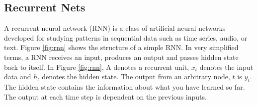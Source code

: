 \subsection{Recurrent Nets} \label{sec:reccurent_nets}

A recurrent neural network (RNN) is a class of artificial neural networks developed for studying patterns in sequential data such as time series, audio, or text. Figure \ref{fig:rnn} shows the structure of a simple RNN. In very simplified terms, a RNN receives an input, produces an output and passes hidden state back to itself. In Figure \ref{fig:rnn}, A denotes a recurrent unit, $x_t$ denotes the input data and  $h_t$ denotes the hidden state. The output from an arbitrary node, $t$ is $y_t$. %
The hidden state contains the information about what you have learned so far. The output at each time step is dependent on the previous inputs. 


